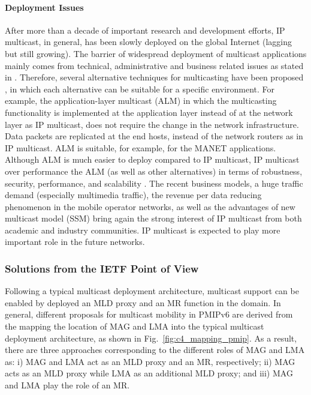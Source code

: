 \paragraph{Deployment Issues}
After more than a decade of important research and development efforts, IP multicast, in general, has been slowly deployed on the global Internet (lagging but still growing). The barrier of widespread deployment of multicast applications mainly comes from technical, administrative and business related issues as stated in \cite{alternative_multicast}. Therefore, several alternative techniques for multicasting have been proposed \cite{alternative_multicast}, in which each alternative can be suitable for a specific environment. For example, the application-layer multicast (ALM) \cite{application_multicast} in which the multicasting functionality is implemented at the application layer instead of at the network layer as IP multicast, does not require the change in the network infrastructure. Data packets are replicated at the end hosts, instead of the network routers as in IP multicast. ALM is suitable, for example, for the MANET applications. Although ALM is much easier to deploy compared to IP multicast, IP multicast over performance the ALM (as well as other alternatives) in terms of robustness, security, performance, and scalability \cite{alternative_multicast}. The recent business models, a huge traffic demand (especially multimedia traffic), the revenue per data reducing phenomenon in the mobile operator networks, as well as the advantages of new multicast model (SSM) bring again the strong interest of IP multicast from both academic and industry communities. IP multicast is expected to play more important role in the future networks. 

\subsubsection{Solutions from the IETF Point of View}
Following a typical multicast deployment architecture, multicast support can be enabled by deployed an MLD proxy and an MR function in the domain. In general, different proposals for multicast mobility in PMIPv6 are derived from the mapping the location of MAG and LMA into the typical multicast deployment architecture, as shown in Fig.~\ref{fig:c4_mapping_pmip}. As a result, there are three approaches corresponding to the different roles of MAG and LMA as: i) MAG and LMA act as an MLD proxy and an MR, respectively; ii) MAG acts as an MLD proxy while LMA as an additional MLD proxy; and iii) MAG and LMA play the role of an MR. 

